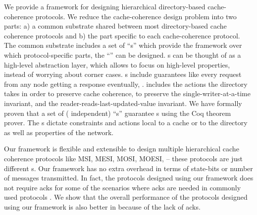 We provide a framework for designing hierarchical directory-based cache-coherence protocols. We reduce the cache-coherence design problem into two parts: a) a common substrate shared between most directory-based cache coherence protocols and b) the part specific to each cache-coherence protocol. The common substrate includes a set of ``\glob{}s'' which provide the framework over which protocol-specific parts, the ``\policy{}'' can be designed. \glob{}s can be thought of as a high-level abstraction layer, which allows \policy{} to focus on high-level properties, instead of worrying about corner cases. \glob{}s include guarantees like every request from any node getting a response eventually, \etc.  \policy{} includes the actions the directory takes in order to preserve cache coherence, \viz to preserve the single-writer-at-a-time invariant, and the reader-reads-last-updated-value invariant. We have formally proven that a set of (\policy{} independent) ``\local{}s'' guarantee \glob{}s using the Coq theorem prover. The \local{}s dictate constraints and actions local to a cache or to the directory as well as properties of the network.

Our framework is flexible and extensible to design multiple hierarchical cache coherence protocols like MSI, MESI, MOSI, MOESI, \etc -- these protocols are just different \policy{}s. Our framework has no extra overhead in terms of state-bits or number of messages transmitted. In fact, the protocols designed using our framework does not require acks for some of the scenarios where acks are needed in commonly used protocols \cite{hammer, moesi}. We show that the overall performance of the protocols designed using our framework is also better in because of the lack of acks.

